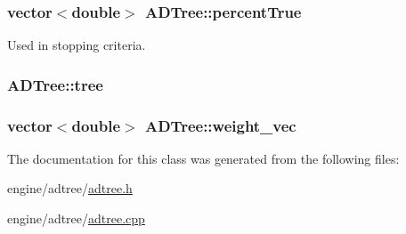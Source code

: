 \label{classADTree_ade70783ee662b06ea7e1030dbd25a978}
\hypertarget{classADTree_a506c3976eb2bbfc129bdfe852886c801}{
\subsubsection[{percentTrue}]{\setlength{\rightskip}{0pt plus 5cm}vector$<$double$>$ {\bf ADTree::percentTrue}}}
\label{classADTree_a506c3976eb2bbfc129bdfe852886c801}


Used in stopping criteria. 

\hypertarget{classADTree_a8bfb36a2d5ded97c2d4ce61046996694}{
\subsubsection[{tree}]{ {\bf ADTree::tree}}}
\label{classADTree_a8bfb36a2d5ded97c2d4ce61046996694}
\hypertarget{classADTree_a3fdcc9137b95113198be7c4861516df0}{
\subsubsection[{weight\_\-vec}]{\setlength{\rightskip}{0pt plus 5cm}vector$<$double$>$ {\bf ADTree::weight\_\-vec}}}
\label{classADTree_a3fdcc9137b95113198be7c4861516df0}


The documentation for this class was generated from the following files:\begin{DoxyCompactItemize}
\item 
engine/adtree/\hyperlink{adtree_8h}{adtree.h}\item 
engine/adtree/\hyperlink{adtree_8cpp}{adtree.cpp}\end{DoxyCompactItemize}
